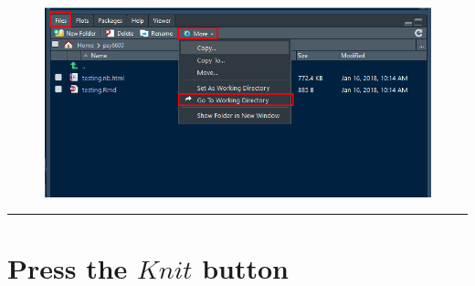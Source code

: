 \documentclass[]{book}
\theoremstyle{definition}
\theoremstyle{definition}
\theoremstyle{definition}
\theoremstyle{remark}
\begin{document}
\begin{figure}
\centering
\includegraphics{img/files_goto_wd.png}
\caption{}
\end{figure}

\begin{center}\rule{0.5\linewidth}{\linethickness}\end{center}

\section{\texorpdfstring{Press the \(Knit\)
button}{Press the Knit button}}\label{press-the-knit-button}


\end{document}

